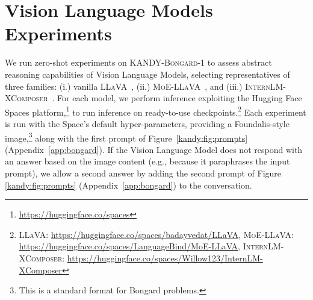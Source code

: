 \section{Vision Language Models Experiments}\label{kandy:sec:bongard}
\begin{table}[t]
	\centering
	\caption[Vision Language Models experiments on \textsc{KANDY-Bongard-1}]{Qualitative statistics on Vision Language Models experiments. Recurring hallucinations are  ``grid pattern'',  ``same color'' and ``three objects on the left''.}
	\label{kandy:tab:bongard}
\end{table}
We run zero-shot experiments on \textsc{KANDY-Bongard-1} to assess abstract reasoning capabilities of Vision Language Models, selecting representatives of three families: (i.) vanilla \textsc{LLaVA}~\cite{liu2024visual}, (ii.)  \textsc{MoE-LLaVA}~\cite{lin2024moe}, and (iii.)  \textsc{InternLM-XComposer}~\cite{zhang2023internlm}.
For each model, we perform inference exploiting the Hugging Face Spaces platform,\footnote{\url{https://huggingface.co/spaces}} to run inference on ready-to-use checkpoints.\footnote{\textsc{LLaVA}: \url{https://huggingface.co/spaces/badayvedat/LLaVA}, \textsc{MoE-LLaVA}: \url{https://huggingface.co/spaces/LanguageBind/MoE-LLaVA}, \textsc{InternLM-XComposer}: \url{https://huggingface.co/spaces/Willow123/InternLM-XComposer}}
Each experiment is run with the Space's default hyper-parameters, providing a Foundalis-style image,\footnote{This is a standard format for Bongard problems.} along with the first prompt of Figure~\ref{kandy:fig:prompts} (Appendix~\ref{app:bongard}). If the Vision Language Model does not respond with an answer based on the image content (e.g., because it paraphrases the input prompt), we allow a second answer by adding the second prompt of Figure \ref{kandy:fig:prompts} (Appendix~\ref{app:bongard}) to the conversation.
